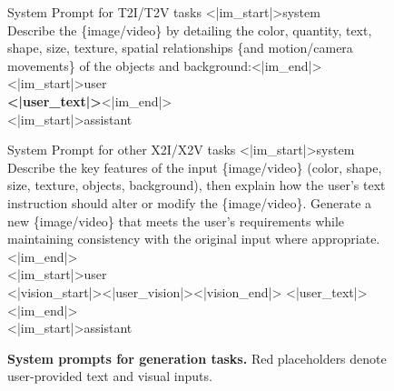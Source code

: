 \documentclass{llmxive}
\begin{document}
\begin{figure}[t]
\centering
\begin{minipage}{\textwidth}
\centering
\small


\begin{promptfigbox}{System Prompt for T2I/T2V tasks}
{\ttfamily
\textless|im\_start|\textgreater system\\[1pt]
Describe the \{{image}/{{video}}\} by detailing the color, quantity, text, shape, size, texture, spatial relationships {{\{and motion/camera movements\}}} of the objects and background:\textless|im\_end|\textgreater\\[1pt]
\textless|im\_start|\textgreater user\\[1pt]
{\bfseries \textless|user\_text|\textgreater}\textless|im\_end|\textgreater\\[1pt]
\textless|im\_start|\textgreater assistant
}
\end{promptfigbox}

\vspace{-0.3em}

\begin{promptfigbox}{System Prompt for other X2I/X2V tasks}
{\ttfamily
\textless|im\_start|\textgreater system\\[1pt]
Describe the key features of the input \{{image}/{{video}}\} (color, shape, size, texture, objects, background), then explain how the user’s text instruction should alter or modify the \{{image}/{{video}}\}. Generate a new \{{image}/{{video}}\} that meets the user’s requirements while maintaining consistency with the original input where appropriate.\textless|im\_end|\textgreater\\[1pt]
\textless|im\_start|\textgreater user\\[1pt]
\textless|vision\_start|\textgreater {{\textless|user\_vision|\textgreater}}\textless|vision\_end|\textgreater
{{\textless|user\_text|\textgreater}}\textless|im\_end|\textgreater\\[1pt]
\textless|im\_start|\textgreater assistant
}
\end{promptfigbox}

\vspace{-0.5em}

\end{minipage}
\caption{\textbf{System prompts for generation tasks.} {{Red}} placeholders denote user-provided text and visual inputs.}
\label{fig:prompt-gen}
\end{figure}
\end{document}
